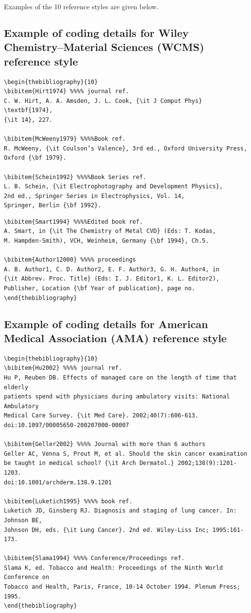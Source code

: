 \documentclass[11pt]{article}
\begin{document}
\noindent Examples of the 10 reference styles are given below.

\subsection{Example of coding details for Wiley Chemistry--Material Sciences (WCMS) reference style}
\begin{verbatim}
\begin{thebibliography}{10}
\bibitem{Hirt1974} %%%% journal ref.
C. W. Hirt, A. A. Amsden, J. L. Cook, {\it J Comput Phys} \textbf{1974},
{\it 14}, 227.

\bibitem{McWeeny1979} %%%%Book ref.
R. McWeeny, {\it Coulson’s Valence}, 3rd ed., Oxford University Press,
Oxford {\bf 1979}.

\bibitem{Schein1992} %%%%Book Series ref.
L. B. Schein, {\it Electrophotography and Development Physics},
2nd ed., Springer Series in Electrophysics, Vol. 14,
Springer, Berlin {\bf 1992}.
\end{verbatim}


\begin{verbatim}
\bibitem{Smart1994} %%%%Edited book ref.
A. Smart, in {\it The Chemistry of Metal CVD} (Eds: T. Kodas,
M. Hampden-Smith), VCH, Weinheim, Germany {\bf 1994}, Ch.5.

\bibitem{Author12000} %%%% proceedings
A. B. Author1, C. D. Author2, E. F. Author3, G. H. Author4, in
{\it Abbrev. Proc. Title} (Eds: I. J. Editor1, K. L. Editor2),
Publisher, Location {\bf Year of publication}, page no.
\end{thebibliography}
\end{verbatim}


\subsection{Example of coding details for American Medical Association (AMA) reference style}
\begin{verbatim}
\begin{thebibliography}{10}
\bibitem{Hu2002} %%%% journal ref.
Hu P, Reuben DB. Effects of managed care on the length of time that elderly
patients spend with physicians during ambulatory visits: National Ambulatory
Medical Care Survey. {\it Med Care}. 2002;40(7):606-613.
doi:10.1097/00005650-200207000-00007

\bibitem{Geller2002} %%%% Journal with more than 6 authors
Geller AC, Venna S, Prout M, et al. Should the skin cancer examination
be taught in medical school? {\it Arch Dermatol.} 2002;138(9):1201-1203.
doi:10.1001/archderm.138.9.1201

\bibitem{Luketich1995} %%%% book ref.
Luketich JD, Ginsberg RJ. Diagnosis and staging of lung cancer. In: Johnson BE,
Johnson DH, eds. {\it Lung Cancer}. 2nd ed. Wiley-Liss Inc; 1995:161-173.

\bibitem{Slama1994} %%%% Conference/Proceedings ref.
Slama K, ed. Tobacco and Health: Proceedings of the Ninth World Conference on
Tobacco and Health, Paris, France, 10-14 October 1994. Plenum Press; 1995.
\end{thebibliography}
\end{verbatim}
\end{document}
